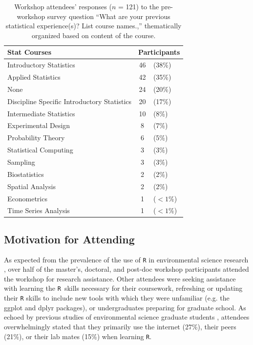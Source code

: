 \documentclass[12pt]{article}
\newcommand{\R}{\texttt{R}}
\begin{document}
{
\begin{table}[h!]
    \centering
    \begin{tabular}{lcl}
\hline
Stat Courses & \multicolumn{2}{c}{Participants} \\
\hline
Introductory Statistics & 46 & (38\%) \\
Applied Statistics & 42 & (35\%) \\
None & 24 & (20\%) \\
Discipline Specific Introductory Statistics & 20 & (17\%)\\
Intermediate Statistics & 10 & (8\%)\\
Experimental Design	& 8 & (7\%)\\
Probability Theory	& 6 & (5\%) \\
Statistical Computing & 3 & (3\%)\\
Sampling & 3 & (3\%)\\
Biostatistics & 2 & (2\%) \\
Spatial Analysis & 2 & (2\%)\\
Econometrics & 1 & ($<1$\%)\\
Time Series Analysis & 1&  ($<1$\%)\\
\hline
\end{tabular}
\caption{Workshop attendees' responses ($n$ = 121) to the pre-workshop survey
question ``What are your previous statistical experience(s)?  List course
names.,'' thematically organized based on content of the course.}
\label{tab:statistics}
\end{table}
}

\subsection{Motivation for Attending} 

\noindent As expected from the prevalence of the use of \texttt{R} in environmental
science research \citep{Rpopular, mislan}, over half of the master's, doctoral, 
and post-doc workshop participants attended the workshop for research
assistance. Other attendees were seeking assistance with learning the \R~skills
necessary for their coursework, refreshing or updating their \texttt{R}
skills to include new tools with which they were unfamiliar (e.g. the ggplot and 
dplyr packages), or undergraduates preparing for graduate school. As echoed by
previous studies of environmental science graduate students \citep{carpentry,
theobold}, attendees overwhelmingly stated that they primarily use the internet
(27\%), their peers (21\%), or their lab mates (15\%) when learning \texttt{R}.
\end{document}
